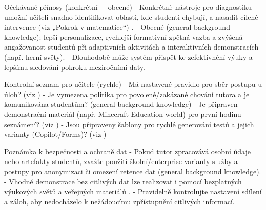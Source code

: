 Očekávané přínosy (konkrétní + obecné)
- Konkrétní: nástroje pro diagnostiku umožní učiteli snadno identifikovat oblasti, kde studenti chybují, a nasadit cílené intervence (viz „Pokrok v matematice“) \cite{kb_ai_101_tipu_pdf_04e4a115_page_8_1}.
- Obecné (general background knowledge): lepší personalizace, rychlejší formativní zpětná vazba a zvýšená angažovanost studentů při adaptivních aktivitách a interaktivních demonstracích (např. herní světy).
- Dlouhodobě může systém přispět ke zefektivnění výuky a lepšímu sledování pokroku meziročními daty.

Kontrolní seznam pro učitele (rychle)
- Má nastavené pravidlo pro sběr postupu u úloh? (viz \cite{kb_ai_101_tipu_pdf_04e4a115_page_8_1})
- Je vymezena politika pro povolené/zakázané chování tutora a je komunikována studentům? (general background knowledge)
- Je připraven demonstrační materiál (např. Minecraft Education world) pro první hodinu seznámení? (viz \cite{kb_ai_101_tipu_pdf_04e4a115_page_15_2})
- Jsou připraveny šablony pro rychlé generování testů a jejich varianty (Copilot/Forms)? (viz \cite{kb_ai_101_tipu_pdf_04e4a115_page_36_1})

Poznámka k bezpečnosti a ochraně dat
- Pokud tutor zpracovává osobní údaje nebo artefakty studentů, zvažte použití školní/enterprise varianty služby a postupy pro anonymizaci či omezení retence dat (general background knowledge).
- Vhodné demonstrace bez citlivých dat lze realizovat i pomocí bezplatných výukových světů a veřejných materiálů \cite{kb_ai_101_tipu_pdf_04e4a115_page_15_2}.
- Pravidelně kontrolujte nastavení sdílení a záloh, aby nedocházelo k nežádoucímu zpřístupnění citlivých informací.